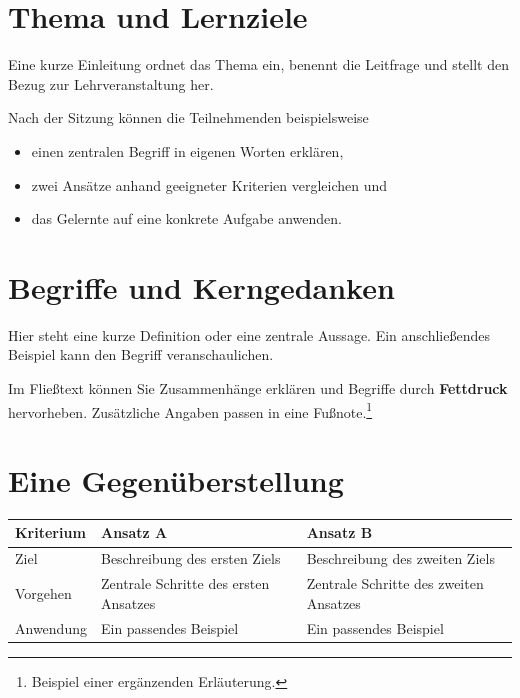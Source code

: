 \documentclass[11pt,a4paper,parskip=half]{scrartcl}
\begin{document}
\handouttitel

\section{Thema und Lernziele}
Eine kurze Einleitung ordnet das Thema ein, benennt die Leitfrage
und stellt den Bezug zur Lehrveranstaltung her.

Nach der Sitzung können die Teilnehmenden beispielsweise
\begin{itemize}
  \item einen zentralen Begriff in eigenen Worten erklären,
  \item zwei Ansätze anhand geeigneter Kriterien vergleichen und
  \item das Gelernte auf eine konkrete Aufgabe anwenden.
\end{itemize}

\section{Begriffe und Kerngedanken}
\begin{merksatz}
Hier steht eine kurze Definition oder eine zentrale Aussage.
Ein anschließendes Beispiel kann den Begriff veranschaulichen.
\end{merksatz}

Im Fließtext können Sie Zusammenhänge erklären und Begriffe durch
\textbf{Fettdruck} hervorheben. Zusätzliche Angaben passen in eine
Fußnote.\footnote{Beispiel einer ergänzenden Erläuterung.}

\section{Eine Gegenüberstellung}
\begin{tabularx}{\linewidth}{@{}P{.22\linewidth}Y Y@{}}
  \toprule
  \textbf{Kriterium} & \textbf{Ansatz A} & \textbf{Ansatz B} \\
  \midrule
  Ziel & Beschreibung des ersten Ziels & Beschreibung des zweiten Ziels \\
  Vorgehen & Zentrale Schritte des ersten Ansatzes & Zentrale Schritte des zweiten Ansatzes \\
  Anwendung & Ein passendes Beispiel & Ein passendes Beispiel \\
  \bottomrule
\end{tabularx}
\end{document}
